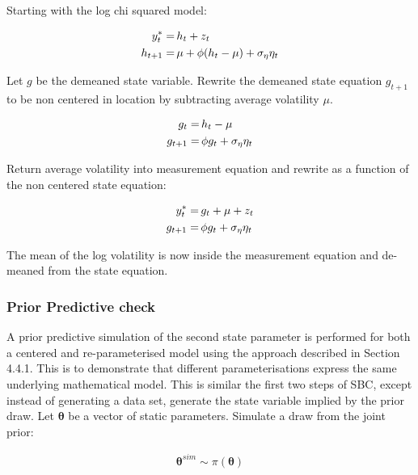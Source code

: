 \documentclass[12pt, a4paper]{article}
\begin{document}
        Starting with the log chi squared model:

        $$
        \begin{aligned}
        y^{\ast}_t =& \space \, h_t + z_t \\
        h_{t+1} =& \space \, \mu +\phi(h_t - \mu) + \sigma_{\eta} \eta_t
        \end{aligned}
        $$
        

        Let $g$ be the demeaned state variable. Rewrite the demeaned state equation $g_{t+1}$ to be non centered in location by subtracting average volatility $\mu$.

        $$
        \begin{aligned}
        g_t =& \space \, h_t - \mu \\
        g_{t+1} =& \space \, \phi g_t + \sigma_{\eta}\eta_{t}
        \end{aligned}
        $$

        Return average volatility into measurement equation and rewrite as a function of the non centered state equation:

        $$
        \begin{aligned}
        y^{\ast}_t =& \space \, g_t + \mu + z_t \\
        g_{t+1} =& \space \, \phi g_t + \sigma_{\eta}\eta_{t}
        \end{aligned}
        $$

        The mean of the log volatility is now inside the measurement equation and de-meaned from the state equation.
    
    \subsubsection{Prior Predictive check}
        A prior predictive simulation of the second state parameter is performed for both a centered and re-parameterised model using the approach described in Section 4.4.1. This is to demonstrate that different parameterisations express the same underlying mathematical model. This is similar the first two steps of SBC, except instead of generating a data set, generate the state variable implied by the prior draw. Let $\boldsymbol{\theta}$ be a vector of static parameters. Simulate a draw from the joint prior:

        $$
        \begin{aligned}
        \boldsymbol{\theta}^{sim} \sim \pi(\boldsymbol{\theta})
        \end{aligned}
        $$
\end{document}
